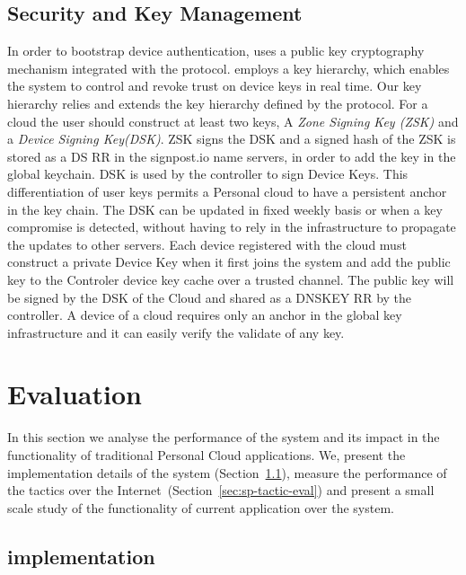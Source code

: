 \subsection{Security and Key Management} \label{signpost-security}

In order to bootstrap device authentication, \signpost uses a public key
cryptography mechanism integrated with the \dnssec protocol.  \signpost employs
a key hierarchy, which enables the system to control and revoke trust on device
keys in real time. Our key hierarchy relies and extends the key hierarchy
defined by the \dnssec protocol. For a \signpost cloud the user should construct
at least two keys, A {\it Zone Signing Key (ZSK)} and a {\it Device Signing
  Key(DSK)}. ZSK signs the DSK and a signed hash of the ZSK is stored as a
DS RR in the signpost.io name servers, in order to add the key in the global \dnssec
keychain. DSK is used by the controller to sign Device Keys. This differentiation 
of user keys permits a Personal cloud to
have a persistent anchor in the \dnssec key chain. The DSK can be updated
in fixed weekly basis or when a key
compromise is detected, without having to rely in the \dnssec infrastructure to
propagate the updates to other servers. Each device registered with the cloud
must construct a private Device Key when it first joins the system and add the
public key to the Controler device key cache over a trusted channel. The public
key will be signed by the DSK of the Cloud and shared as a DNSKEY RR by the
controller. A device of a \signpost cloud requires only an anchor in the global
\dnssec key infrastructure and it can easily verify the validate of any
\signpost key.  


\section{Evaluation}\label{sec:signpost-evaluation}

In this section we analyse the performance of the \signpost system and its
impact in the functionality of traditional Personal Cloud applications. We,
 present the implementation details of the system
(Section~\ref{sec:sp-implementation}), measure the performance of the
\signpost tactics over the Internet~(Section~\ref{sec:sp-tactic-eval}) and
present a small scale study of the functionality of current application over the
\signpost system. 

\subsection{\signpost implementation} \label{sec:sp-implementation}


